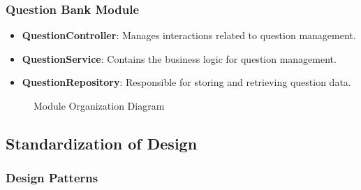 \subsubsection{Question Bank Module}

\begin{itemize}
  \item \textbf{QuestionController}: Manages interactions related to question management.
  \item \textbf{QuestionService}: Contains the business logic for question management.
  \item \textbf{QuestionRepository}: Responsible for storing and retrieving question data.
\end{itemize}

\begin{figure}[htbp]
  \centering
  \caption{Module Organization Diagram}
  \label{fig:development}
\end{figure}


\subsection{Standardization of Design}

\subsubsection{Design Patterns}


